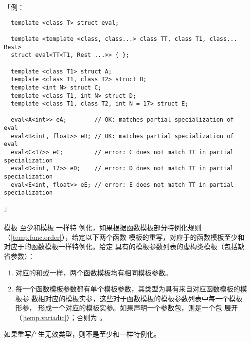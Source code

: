 「例：
\begin{lstlisting}
  template <class T> struct eval;

  template <template <class, class...> class TT, class T1, class... Rest>
  struct eval<TT<T1, Rest ...>> { };

  template <class T1> struct A;
  template <class T1, class T2> struct B;
  template <int N> struct C;
  template <class T1, int N> struct D;
  template <class T1, class T2, int N = 17> struct E;

  eval<A<int>> eA;        // OK: matches partial specialization of eval
  eval<B<int, float>> eB; // OK: matches partial specialization of eval
  eval<C<17>> eC;         // error: C does not match TT in partial specialization
  eval<D<int, 17>> eD;    // error: D does not match TT in partial specialization
  eval<E<int, float>> eE; // error: E does not match TT in partial specialization
\end{lstlisting}」

\paragraph{}
模板 至少和模板 一样特
例化，如果根据函数模板部分特例化规则（\ref{temp.func.order}），给定以下两个函数
模板的重写，对应于的函数模板至少和对应于的函数模板一样特例化。给定
具有的模板参数列表的虚构类模板（包括缺省参数）：
\begin{enumerate}
  \item{对应的和或一样，两个函数模板均有相同模板参数。}
  \item{每一个函数模板参数都有单个模板参数，其类型为具有来自对应函数模板的模板参
    数相对应的模板实参，这些对于函数模板的模板参数列表中每一个模板形参，
    形成一个对应的模板实参。如果声明一个参数包，则是一个包
    展开（\ref{temp.variadic}）；否则为
    。}
\end{enumerate}
如果重写产生无效类型，则不是至少和一样特例化。

